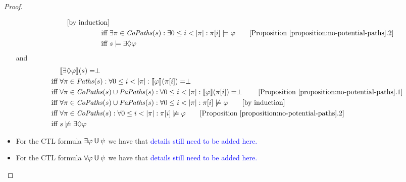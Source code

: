 \documentclass[12pt]{article}
\newcommand{\eventually}{\Diamond}
\newcommand{\until}{\mathbin{\sf U}}
\theoremstyle{definition}
\newcommand{\comment}[1]{\hspace{2em}[\mbox{#1}]}
\newcommand{\satisfaction}[1]{\llbracket #1 \rrbracket}
\newenvironment{franck}{\color{red}}{\color{black}}
\begin{document}
\begin{proof}
\begin{itemize}
\begin{franck}
\begin{align*}
\comment{by induction}\\
\mbox{iff } & \exists \pi \in \mathit{CoPaths}(s) : \exists 0 \leq i < |\pi| : \pi[i] \models \varphi
\comment{Proposition~\ref{proposition:no-potential-paths}.2}\\
\mbox{iff } & s \models \exists \eventually \varphi
\end{align*}
and
\begin{align*}
& \satisfaction{\exists \eventually \varphi}(s) = \perp\\
\mbox{iff } & \forall \pi \in \mathit{Paths}(s)  : \forall 0 \leq i < |\pi| : \satisfaction{\varphi}(\pi[i]) = \perp\\
\mbox{iff } & \forall \pi \in \mathit{CoPaths}(s) \cup \mathit{PaPaths}(s) : \forall 0 \leq i < |\pi| : \satisfaction{\varphi}(\pi[i]) = \perp
\comment{Proposition~\ref{proposition:no-potential-paths}.1}\\
\mbox{iff } & \forall \pi \in \mathit{CoPaths}(s) \cup \mathit{PaPaths}(s) : \forall 0 \leq i < |\pi| : \pi[i] \not\models \varphi \comment{by induction}\\
\mbox{iff } & \forall \pi \in \mathit{CoPaths}(s) : \forall 0 \leq i < |\pi| : \pi[i] \not\models \varphi \comment{Proposition~\ref{proposition:no-potential-paths}.2}\\
\mbox{iff } & s \not\models \exists \eventually \varphi
\end{align*}
\end{franck}
\item
For the CTL formula $\exists \varphi \until \psi$ we have that
\textcolor{blue}{details still need to be added here.}
\item
For the CTL formula $\forall \varphi \until \psi$ we have that \textcolor{blue}{details still need to be added here.}
\end{itemize}
\end{proof}

\section{}
\end{document}
